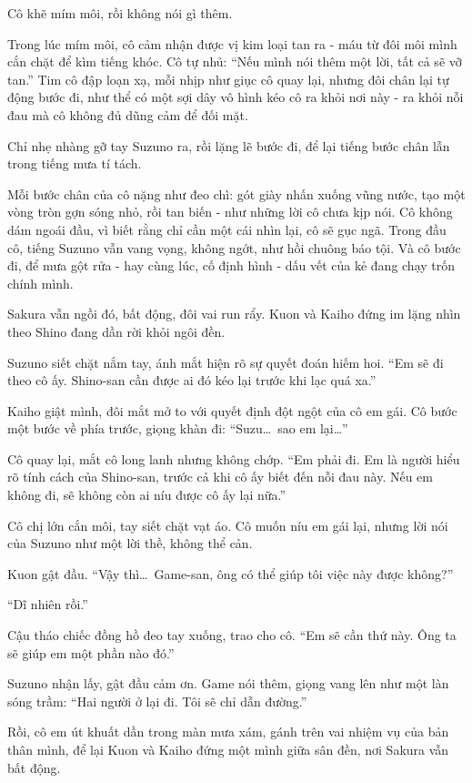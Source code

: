 \documentclass[../main.tex]{subfiles}
\begin{document}
Cô khẽ mím môi, rồi không nói gì thêm.

Trong lúc mím môi, cô cảm nhận được vị kim loại tan ra - máu từ đôi môi mình cắn chặt để kìm tiếng khóc. Cô tự nhủ: ``Nếu mình nói thêm một lời, tất cả sẽ vỡ tan.'' Tim cô đập loạn xạ, mỗi nhịp như giục cô quay lại, nhưng đôi chân lại tự động bước đi, như thể có một sợi dây vô hình kéo cô ra khỏi nơi này - ra khỏi nỗi đau mà cô không đủ dũng cảm để đối mặt.

Chỉ nhẹ nhàng gỡ tay Suzuno ra, rồi lặng lẽ bước đi, để lại tiếng bước chân lẫn trong tiếng mưa tí tách.

Mỗi bước chân của cô nặng như đeo chì: gót giày nhấn xuống vũng nước, tạo một vòng tròn gợn sóng nhỏ, rồi tan biến - như những lời cô chưa kịp nói. Cô không dám ngoái đầu, vì biết rằng chỉ cần một cái nhìn lại, cô sẽ gục ngã. Trong đầu cô, tiếng Suzuno vẫn vang vọng, không ngớt, như hồi chuông báo tội. Và cô bước đi, để mưa gột rửa - hay cùng lúc, cố định hình - dấu vết của kẻ đang chạy trốn chính mình.


Sakura vẫn ngồi đó, bất động, đôi vai run rẩy. Kuon và Kaiho đứng im lặng nhìn theo Shino đang dần rời khỏi ngôi đền.

Suzuno siết chặt nắm tay, ánh mắt hiện rõ sự quyết đoán hiếm hoi. ``Em sẽ đi theo cô ấy. Shino-san cần được ai đó kéo lại trước khi lạc quá xa.''

Kaiho giật mình, đôi mắt mở to với quyết định đột ngột của cô em gái. Cô bước một bước về phía trước, giọng khàn đi: ``Suzu\dots\ sao em lại\dots''

Cô quay lại, mắt cô long lanh nhưng không chớp. ``Em phải đi. Em là người hiểu rõ tính cách của Shino-san, trước cả khi cô ấy biết đến nỗi đau này. Nếu em không đi, sẽ không còn ai níu được cô ấy lại nữa.''

Cô chị lớn cắn môi, tay siết chặt vạt áo. Cô muốn níu em gái lại, nhưng lời nói của Suzuno như một lời thề, không thể cản.

Kuon gật đầu. ``Vậy thì\dots\ Game-san, ông có thể giúp tôi việc này được không?''

``Dĩ nhiên rồi.''

Cậu tháo chiếc đồng hồ đeo tay xuống, trao cho cô. ``Em sẽ cần thứ này. Ông ta sẽ giúp em một phần nào đó.''

Suzuno nhận lấy, gật đầu cảm ơn. Game nói thêm, giọng vang lên như một làn sóng trầm: ``Hai người ở lại đi. Tôi sẽ chỉ dẫn đường.''

Rồi, cô em út khuất dần trong màn mưa xám, gánh trên vai nhiệm vụ của bản thân mình, để lại Kuon và Kaiho đứng một mình giữa sân đền, nơi Sakura vẫn bất động.
\end{document}
